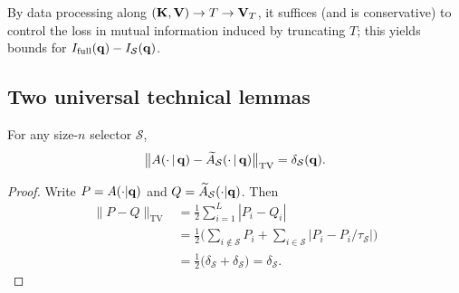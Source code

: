 \begin{remark}
By data processing along $(\mathbf{K},\mathbf{V})\to T\to \mathbf{V}_T$, it suffices (and is conservative) to control the loss in mutual information induced by truncating $T$; this yields bounds for
$I_{\mathrm{full}}(\mathbf{q})-I_{\mathcal S}(\mathbf{q})$.
\end{remark}

\subsection{Two universal technical lemmas}
\label{sec:app_tech_lemmas}

\begin{lemma}
\label{lem:tv}
For any size-$n$ selector $\mathcal S$,
\begin{equation}
    \big\|A(\cdot\,|\,\mathbf{q})-\widetilde A_{\mathcal S}(\cdot\,|\,\mathbf{q})\big\|_{\mathrm{TV}}
=\delta_{\mathcal S}(\mathbf{q}).
\end{equation}

\begin{proof}
Write $P=A(\cdot|\mathbf{q})$ and $Q=\widetilde A_{\mathcal S}(\cdot|\mathbf{q})$. Then
\begin{align*}
\|P-Q\|_{\mathrm{TV}}
&=\tfrac12\sum_{i=1}^L |P_i-Q_i| \\
&=\tfrac12\Big(\sum_{i\notin\mathcal S} P_i + \sum_{i\in\mathcal S}\big|P_i-P_i/\tau_{\mathcal S}\big|\Big)\\
&=\tfrac12\big(\delta_{\mathcal S}+\delta_{\mathcal S}\big)=\delta_{\mathcal S}.
\end{align*}\end{proof}\end{lemma}

